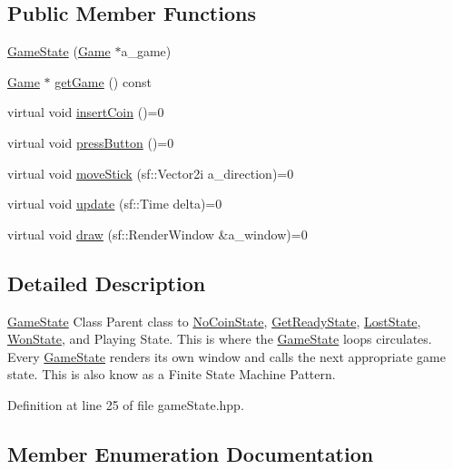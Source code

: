 \subsection*{Public Member Functions}
\begin{DoxyCompactItemize}
\item 
\hyperlink{class_game_state_a294ebc243ce5cf5f845b8548aba8e723}{Game\+State} (\hyperlink{class_game}{Game} $\ast$a\+\_\+game)
\item 
\hyperlink{class_game}{Game} $\ast$ \hyperlink{class_game_state_a7f1afbce585f48311006ddb00c26e32f}{get\+Game} () const
\item 
virtual void \hyperlink{class_game_state_a4cd6f5b4ad23fc08dca287df26d94b94}{insert\+Coin} ()=0
\item 
virtual void \hyperlink{class_game_state_aa14eeaf244bcf19b7013af75cb722dde}{press\+Button} ()=0
\item 
virtual void \hyperlink{class_game_state_aaae8c1b3ae6969eb2dd81bfc12fbf43f}{move\+Stick} (sf\+::\+Vector2i a\+\_\+direction)=0
\item 
virtual void \hyperlink{class_game_state_ab1fe4312f7ce88e7dc11f9935dee67d1}{update} (sf\+::\+Time delta)=0
\item 
virtual void \hyperlink{class_game_state_a5ffd5ce9acb7499ddef613e8836d1ef8}{draw} (sf\+::\+Render\+Window \&a\+\_\+window)=0
\end{DoxyCompactItemize}


\subsection{Detailed Description}
\hyperlink{class_game_state}{Game\+State} Class Parent class to \hyperlink{class_no_coin_state}{No\+Coin\+State}, \hyperlink{class_get_ready_state}{Get\+Ready\+State}, \hyperlink{class_lost_state}{Lost\+State}, \hyperlink{class_won_state}{Won\+State}, and Playing State. This is where the \hyperlink{class_game_state}{Game\+State} loops circulates. Every \hyperlink{class_game_state}{Game\+State} renders its own window and calls the next appropriate game state. This is also know as a Finite State Machine Pattern. 

Definition at line 25 of file game\+State.\+hpp.



\subsection{Member Enumeration Documentation}
\mbox{\label{class_game_state_a81618e0403319d48e9f25347111f8157}} 
